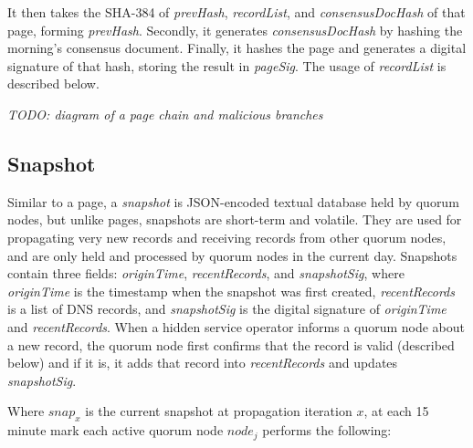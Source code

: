 It then takes the SHA-384 of \textit{prevHash}, \textit{recordList}, and \textit{consensusDocHash} of that page, forming \textit{prevHash}. Secondly, it generates \textit{consensusDocHash} by hashing the morning's consensus document. Finally, it hashes the page and generates a digital signature of that hash, storing the result in \textit{pageSig}. The usage of \textit{recordList} is described below.

\textit{TODO: diagram of a page chain and malicious branches}

\subsection{Snapshot}

Similar to a page, a \textit{snapshot} is JSON-encoded textual database held by quorum nodes, but unlike pages, snapshots are short-term and volatile. They are used for propagating very new records and receiving records from other quorum nodes, and are only held and processed by quorum nodes in the current day. Snapshots contain three fields: \textit{originTime}, \textit{recentRecords}, and \textit{snapshotSig}, where \textit{originTime} is the timestamp when the snapshot was first created, \textit{recentRecords} is a list of DNS records, and \textit{snapshotSig} is the digital signature of \textit{originTime} and \textit{recentRecords}. When a hidden service operator informs a quorum node about a new record, the quorum node first confirms that the record is valid (described below) and if it is, it adds that record into \textit{recentRecords} and updates \textit{snapshotSig}. 


Where $ snap_{x} $ is the current snapshot at propagation iteration $ x $, at each 15 minute mark each active quorum node $ node_{j} $ performs the following:

